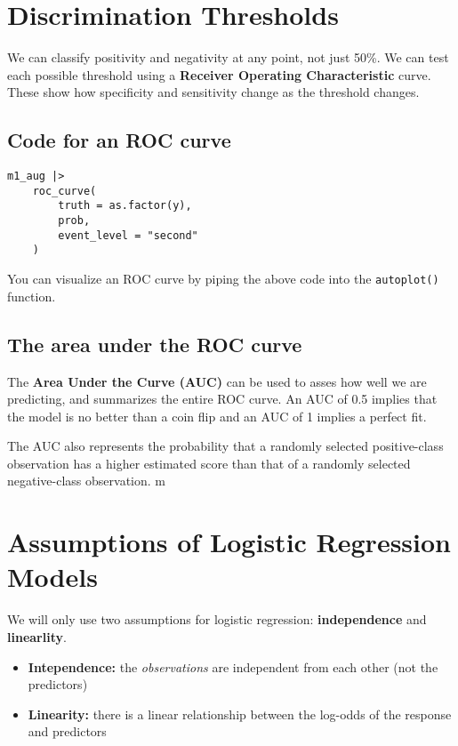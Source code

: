 \documentclass[titlepage, 12pt, leqno]{article}
\begin{document}
\pagebreak
\section{Discrimination Thresholds}
\begin{definition}
We can classify positivity and negativity at any point, not just 50\%. We can
test each possible threshold using a \textbf{Receiver Operating Characteristic}
curve. These show how specificity and sensitivity change as the threshold changes.
\end{definition}

\subsection{Code for an ROC curve}
\begin{verbatim}
m1_aug |>
    roc_curve(
        truth = as.factor(y),
        prob,
        event_level = "second"
    )
\end{verbatim}

\begin{note}
    You can visualize an ROC curve by piping the above code into the
    \texttt{autoplot()} function.
\end{note}

\subsection{The area under the ROC curve}
\begin{definition}
    The \textbf{Area Under the Curve (AUC)} can be used to asses how well we are
    predicting, and summarizes the entire ROC curve. An AUC of 0.5 implies that
    the model is no better than a coin flip and an AUC of 1 implies a perfect fit.
\end{definition}

The AUC also represents the probability that a randomly selected positive-class
observation has a higher estimated score than that of a randomly selected
negative-class observation.
m
\pagebreak
\section{Assumptions of Logistic Regression Models}
We will only use two assumptions for logistic regression: \textbf{independence}
and \textbf{linearlity}.
\begin{itemize}
    \item \textbf{Intependence:} the \textit{observations} are independent from
        each other (not the predictors)
    \item \textbf{Linearity:} there is a linear relationship between the log-odds
        of the response and predictors
\end{itemize}
\end{document}

